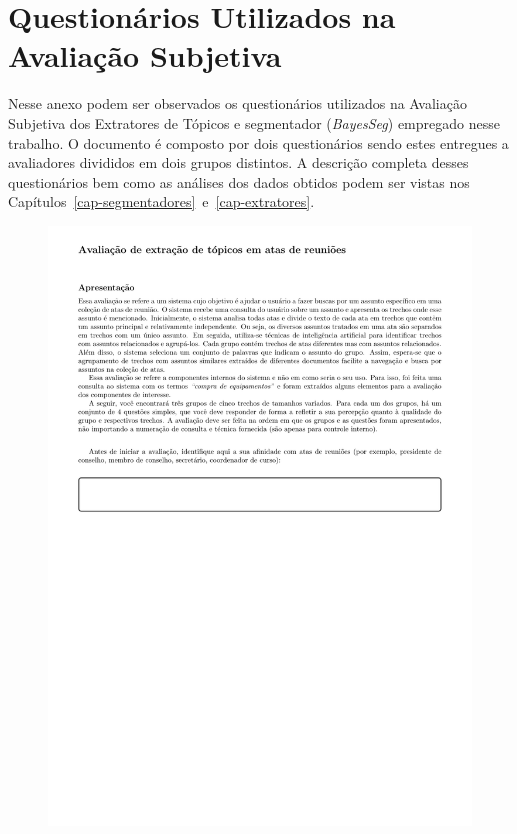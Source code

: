 \chapter{ Questionários Utilizados na Avaliação Subjetiva}\label{apendice1}





Nesse anexo podem ser observados os questionários utilizados na Avaliação Subjetiva dos Extratores de Tópicos e segmentador (\textit{BayesSeg}) empregado nesse trabalho. 
O documento é composto por dois questionários sendo estes entregues a avaliadores divididos em dois grupos distintos.
A descrição completa desses questionários bem como as análises dos dados obtidos podem ser vistas nos Capítulos~\ref{cap-segmentadores}~e~\ref{cap-extratores}.


\begin{figure}[h!]
\center
	\includegraphics[trim={ 40 0 0 0 }, trim={ 0 60 0 66 }, page=1,width=1.1\textwidth]{anexos/avaliacao-sistema/avaliacao-sistema.pdf}
\end{figure}


